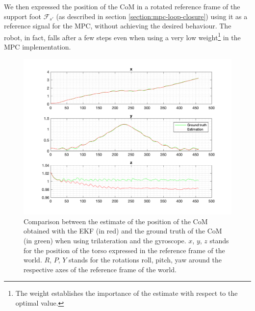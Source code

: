 \documentclass[a4paper]{article}
\begin{document}
We then expressed the position of the CoM
in a rotated reference frame of the support foot $\mathcal{F}_{s'}$
(as described in section \ref{section:mpc-loop-closure}) using it as a reference
signal for the MPC, without achieving the
desired behaviour. The robot, in fact, falls after a few steps even when using
a very low weight\footnote{The weight establishes the importance of the
estimate with respect to the optimal value.} in the MPC implementation. %
\begin{figure}
    \centering
    \includegraphics[width=\textwidth]{images/trilateration_com.png}
    \caption{Comparison between the estimate of the position of the CoM
        obtained with the EKF (in red) and the ground truth of the CoM
        (in green) when using trilateration and the gyroscope.
        $x$, $y$, $z$ stands for the position
        of the torso expressed in the reference frame of the
        world. $R$, $P$, $Y$ stands for the rotations roll,
        pitch, yaw around the respective axes of the
        reference frame of the world.}
    \label{fig:comp_estimated_torso_com}
\end{figure}
\end{document}
